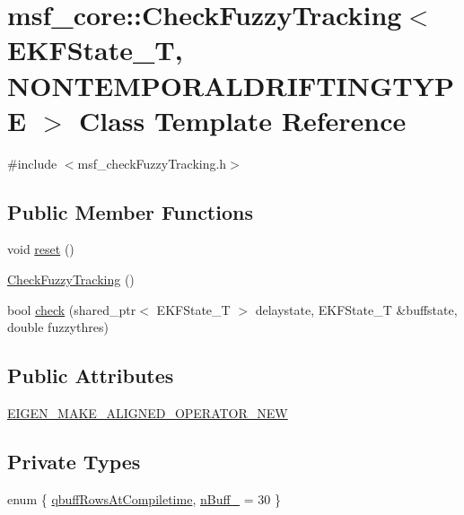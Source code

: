 \hypertarget{classmsf__core_1_1CheckFuzzyTracking}{\section{msf\-\_\-core\-:\-:Check\-Fuzzy\-Tracking$<$ E\-K\-F\-State\-\_\-\-T, N\-O\-N\-T\-E\-M\-P\-O\-R\-A\-L\-D\-R\-I\-F\-T\-I\-N\-G\-T\-Y\-P\-E $>$ Class Template Reference}
\label{classmsf__core_1_1CheckFuzzyTracking}
}


{\ttfamily \#include $<$msf\-\_\-check\-Fuzzy\-Tracking.\-h$>$}

\subsection*{Public Member Functions}
\begin{DoxyCompactItemize}
\item 
void \hyperlink{classmsf__core_1_1CheckFuzzyTracking_a68609f438370a3c2a39e81f3d996ef9a}{reset} ()
\item 
\hyperlink{classmsf__core_1_1CheckFuzzyTracking_a557431eef7d40a22877807c9b5ab2523}{Check\-Fuzzy\-Tracking} ()
\item 
bool \hyperlink{classmsf__core_1_1CheckFuzzyTracking_a3ab7f56a13cc8b8a80c1a97b9be9e8ad}{check} (shared\-\_\-ptr$<$ E\-K\-F\-State\-\_\-\-T $>$ delaystate, E\-K\-F\-State\-\_\-\-T \&buffstate, double fuzzythres)
\end{DoxyCompactItemize}
\subsection*{Public Attributes}
\begin{DoxyCompactItemize}
\item 
\hyperlink{classmsf__core_1_1CheckFuzzyTracking_ae9cbaa66c0aca9cf4264d3017b46a785}{E\-I\-G\-E\-N\-\_\-\-M\-A\-K\-E\-\_\-\-A\-L\-I\-G\-N\-E\-D\-\_\-\-O\-P\-E\-R\-A\-T\-O\-R\-\_\-\-N\-E\-W}
\end{DoxyCompactItemize}
\subsection*{Private Types}
\begin{DoxyCompactItemize}
\item 
enum \{ \hyperlink{classmsf__core_1_1CheckFuzzyTracking_a6f126748326deeb3a587c1a1941989ebaf79d708cc771616ae3aa19084acb2d77}{qbuff\-Rows\-At\-Compiletime}, 
\hyperlink{classmsf__core_1_1CheckFuzzyTracking_a6f126748326deeb3a587c1a1941989eba61c3173392a55f3aaef6cd896f33ab10}{n\-Buff\-\_\-} =  30
 \}
\end{DoxyCompactItemize}
